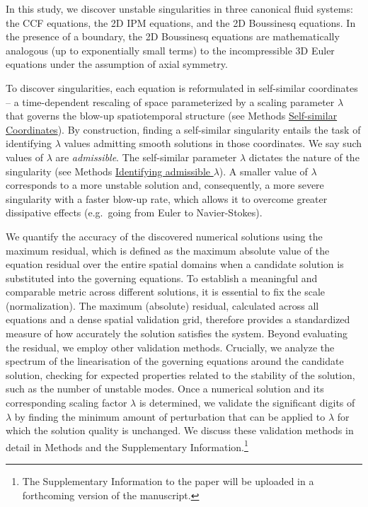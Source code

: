 \documentclass[fleqn,11pt]{wlscirep}
\begin{document}
In this study, we discover unstable singularities in three canonical fluid systems: the CCF equations\cite{Cordoba-Cordoba-Fontelos:CCF-model}, the 2D IPM equations, and the 2D Boussinesq equations. In the presence of a boundary, the 2D Boussinesq equations are mathematically analogous (up to exponentially small terms) to the incompressible 3D Euler equations under the assumption of axial symmetry.

To discover singularities, each equation is reformulated in self-similar coordinates -- a time-dependent rescaling of space parameterized by a scaling parameter $\lambda$ that governs the blow-up spatiotemporal structure (see  Methods \hyperref[methods:self-similar]{Self-similar Coordinates}). By construction, finding a self-similar singularity entails the task of identifying $\lambda$ values admitting smooth solutions in those coordinates. We say such values of $\lambda$ are \textit{admissible}. The self-similar parameter $\lambda$ dictates the nature of the singularity (see Methods \hyperref[methods:lambda]{Identifying admissible $\lambda$}). A smaller value of $\lambda$ corresponds to a more unstable solution and, consequently, a more severe singularity with a faster blow-up rate, which allows it to overcome greater dissipative effects (e.g.\ going from Euler to Navier-Stokes).

We quantify the accuracy of the discovered numerical solutions using the maximum residual, which is defined as the maximum absolute value of the equation residual over the entire spatial domains when a candidate solution is substituted into the governing equations. To establish a meaningful and comparable metric across different solutions, it is essential to fix the scale (normalization). The maximum (absolute) residual, calculated across all equations and a dense spatial validation grid, therefore provides a standardized measure of how accurately the solution satisfies the system. Beyond evaluating the residual, we employ other validation methods. Crucially, we analyze the spectrum of the linearisation of the governing equations around the candidate solution, checking for expected properties related to the stability of the solution, such as the number of unstable modes. Once a numerical solution and its corresponding scaling factor $\lambda$ is determined, we validate the significant digits of $\lambda$ by finding the minimum amount of perturbation that can be applied to $\lambda$ for which the solution quality is unchanged. We discuss these validation methods in detail in Methods and the Supplementary Information.\footnote{The Supplementary Information to the paper will be uploaded in a forthcoming version of the manuscript.}
\end{document}
